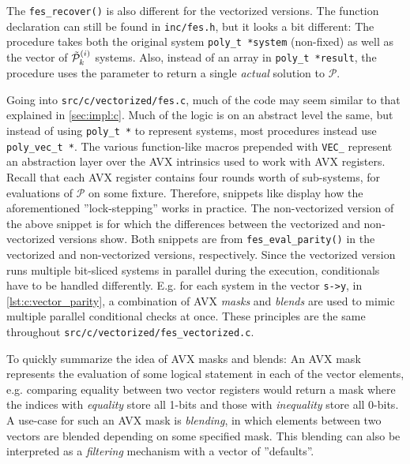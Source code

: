 The \texttt{fes\_recover()} is also different for the vectorized versions. The function declaration can still be found in \texttt{inc/fes.h}, but it looks a bit different:
The procedure takes both the original system \texttt{poly\_t *system} (non-fixed) as well as the vector of $\Tilde{\mathcal{P}}^{(i)}_k$ systems. Also, instead of an array in \texttt{poly\_t *result}, the procedure uses the parameter to return a single \textit{actual} solution to $\mathcal{P}$.

Going into \texttt{src/c/vectorized/fes.c}, much of the code may seem similar to that explained in \cref{sec:impl:c}. Much of the logic is on an abstract level the same, but instead of using \texttt{poly\_t *} to represent systems, most procedures instead use \texttt{poly\_vec\_t *}. The various function-like macros prepended with \texttt{VEC\_} represent an abstraction layer over the AVX intrinsics used to work with AVX registers. Recall that each AVX register contains four rounds worth of sub-systems, for evaluations of $\mathcal{P}$ on some fixture. Therefore, snippets like 
display how the aforementioned ''lock-stepping'' works in practice. The non-vectorized version of the above snippet is
for which the differences between the vectorized and non-vectorized versions show. Both snippets are from \texttt{fes\_eval\_parity()} in the vectorized and non-vectorized versions, respectively. Since the vectorized version runs multiple bit-sliced systems in parallel during the execution, conditionals have to be handled differently. E.g. for each system in the vector \texttt{s->y}, in \cref{lst:c:vector_parity}, a combination of AVX \textit{masks} and \textit{blends} are used to mimic multiple parallel conditional checks at once. These principles are the same throughout \texttt{src/c/vectorized/fes\_vectorized.c}.

To quickly summarize the idea of AVX masks and blends: An AVX mask represents the evaluation of some logical statement in each of the vector elements, e.g. comparing equality between two vector registers would return a mask where the indices with \textit{equality} store all 1-bits and those with \textit{inequality} store all 0-bits. A use-case for such an AVX mask is \textit{blending}, in which elements between two vectors are blended depending on some specified mask. This blending can also be interpreted as a \textit{filtering} mechanism with a vector of ''defaults''.

